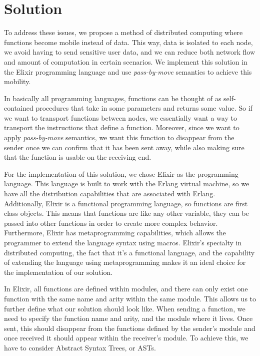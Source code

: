
\chapter{Solution}
\label{cha:Solution}

To address these issues, we propose a method of distributed computing where functions become mobile instead of data. This way, data is isolated to each node, we avoid having to send sensitive user data, and we can reduce both network flow and amount of computation in certain scenarios. We implement this solution in the Elixir programming language and use \textit{pass-by-move} semantics to achieve this mobility.

In basically all programming languages, functions can be thought of as self-contained procedures that take in some parameters and returns some value. So if we want to transport functions between nodes, we essentially want a way to transport the instructions that define a function. Moreover, since we want to apply \textit{pass-by-move} semantics, we want this function to disappear from the sender once we can confirm that it has been sent away, while also making sure that the function is usable on the receiving end. 

For the implementation of this solution, we chose Elixir as the programming language. This language is built to work with the Erlang virtual machine, so we have all the distribution capabilities that are associated with Erlang. Additionally, Elixir is a functional programming language, so functions are first class objects. This means that functions are like any other variable, they can be passed into other functions in order to create more complex behavior. Furthermore, Elixir has metaprogramming capabilities, which allows the programmer to extend the language syntax using macros. Elixir's specialty in distributed computing, the fact that it's a functional language, and the capability of extending the language using metaprogramming makes it an ideal choice for the implementation of our solution.

In Elixir, all functions are defined within modules, and there can only exist one function with the same name and arity within the same module. This allows us to further define what our solution should look like. When sending a function, we need to specify the function name and arity, and the module where it lives. Once sent, this should disappear from the functions defined by the sender's module and once received it should appear within the receiver's module. To achieve this, we have to consider Abstract Syntax Trees, or ASTs. 

